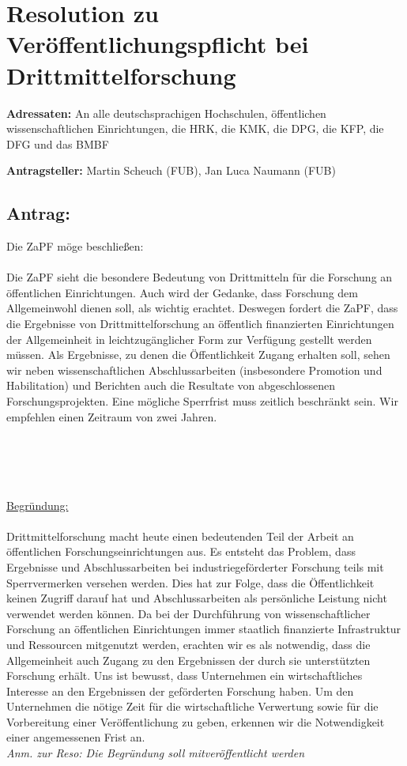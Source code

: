 \documentclass[DIV=9]{scrartcl}
\begin{document}
\section*{Resolution zu Veröffentlichungspflicht bei Drittmittelforschung}

\textbf{Adressaten:} An alle deutschsprachigen Hochschulen, öffentlichen wissenschaftlichen Einrichtungen, die HRK, die KMK, die DPG, die KFP, die DFG und das BMBF

\textbf{Antragsteller:} Martin Scheuch (FUB), Jan Luca Naumann (FUB)

\subsection*{Antrag:}
Die ZaPF möge beschließen:\\\\

Die ZaPF sieht die besondere Bedeutung von Drittmitteln für die Forschung an öffentlichen Einrichtungen. Auch wird der Gedanke, dass Forschung dem Allgemeinwohl dienen soll, als wichtig erachtet. Deswegen fordert die ZaPF, dass die Ergebnisse von Drittmittelforschung an öffentlich finanzierten Einrichtungen der Allgemeinheit in leichtzugänglicher Form zur Verfügung gestellt werden müssen. Als Ergebnisse, zu denen die Öffentlichkeit Zugang erhalten soll, sehen wir neben wissenschaftlichen Abschlussarbeiten (insbesondere Promotion und Habilitation) und Berichten auch die Resultate von abgeschlossenen Forschungsprojekten. Eine mögliche Sperrfrist muss zeitlich beschränkt sein. Wir empfehlen einen Zeitraum von zwei Jahren.

~\\\\\\\\
\underline{Begründung:}\\\\
Drittmittelforschung macht heute einen bedeutenden Teil der Arbeit an öffentlichen Forschungseinrichtungen aus. Es entsteht das Problem, dass Ergebnisse und Abschlussarbeiten bei industriegeförderter Forschung teils mit Sperrvermerken versehen werden. Dies hat zur Folge, dass die Öffentlichkeit keinen Zugriff darauf hat und Abschlussarbeiten als persönliche Leistung nicht verwendet werden können. Da bei der Durchführung von wissenschaftlicher Forschung an öffentlichen Einrichtungen immer staatlich finanzierte Infrastruktur und Ressourcen mitgenutzt werden, erachten wir es als notwendig, dass die Allgemeinheit auch Zugang zu den Ergebnissen der durch sie unterstützten Forschung erhält. Uns ist bewusst, dass Unternehmen ein wirtschaftliches Interesse an den Ergebnissen der geförderten Forschung haben. Um den Unternehmen die nötige Zeit für die wirtschaftliche Verwertung sowie für die Vorbereitung einer Veröffentlichung zu geben, erkennen wir die Notwendigkeit einer angemessenen Frist an.\\

\emph{Anm. zur Reso: Die Begründung soll mitveröffentlicht werden}
\end{document}
